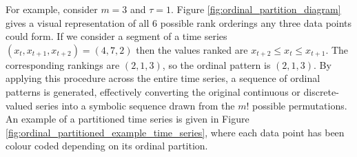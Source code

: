 For example, consider $m=3$ and $\tau=1$. Figure \ref{fig:ordinal_partition_diagram} gives a visual representation of all 6 possible rank orderings any three data points could form. If we consider a segment of a time series $(x_t, x_{t+1}, x_{t+2}) = (4, 7, 2)$ then the values ranked are $x_{t+2} \le x_t \le x_{t+1}$. The corresponding rankings are $(2, 1, 3)$, so the ordinal pattern is $(2, 1, 3)$. By applying this procedure across the entire time series, a sequence of ordinal patterns is generated, effectively converting the original continuous or discrete-valued series into a symbolic sequence drawn from the $m!$ possible permutations. An example of a partitioned time series is given in Figure \ref{fig:ordinal_partitioned_example_time_series}, where each data point has been colour coded depending on its ordinal partition.

